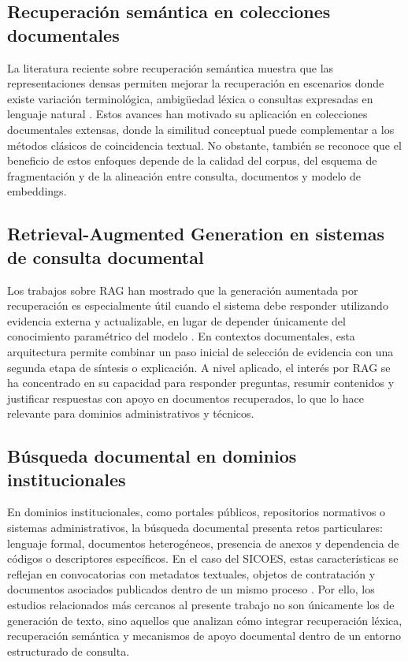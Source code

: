 \subsection{Recuperación semántica en colecciones documentales}

La literatura reciente sobre recuperación semántica muestra que las representaciones densas permiten mejorar la recuperación en escenarios donde existe variación terminológica, ambigüedad léxica o consultas expresadas en lenguaje natural \parencite{reimers2019sentencebert, karpukhin2020dpr}. Estos avances han motivado su aplicación en colecciones documentales extensas, donde la similitud conceptual puede complementar a los métodos clásicos de coincidencia textual. No obstante, también se reconoce que el beneficio de estos enfoques depende de la calidad del corpus, del esquema de fragmentación y de la alineación entre consulta, documentos y modelo de embeddings.

\subsection{Retrieval-Augmented Generation en sistemas de consulta documental}

Los trabajos sobre RAG han mostrado que la generación aumentada por recuperación es especialmente útil cuando el sistema debe responder utilizando evidencia externa y actualizable, en lugar de depender únicamente del conocimiento paramétrico del modelo \parencite{lewis2020rag}. En contextos documentales, esta arquitectura permite combinar un paso inicial de selección de evidencia con una segunda etapa de síntesis o explicación. A nivel aplicado, el interés por RAG se ha concentrado en su capacidad para responder preguntas, resumir contenidos y justificar respuestas con apoyo en documentos recuperados, lo que lo hace relevante para dominios administrativos y técnicos.

\subsection{Búsqueda documental en dominios institucionales}

En dominios institucionales, como portales públicos, repositorios normativos o sistemas administrativos, la búsqueda documental presenta retos particulares: lenguaje formal, documentos heterogéneos, presencia de anexos y dependencia de códigos o descriptores específicos. En el caso del SICOES, estas características se reflejan en convocatorias con metadatos textuales, objetos de contratación y documentos asociados publicados dentro de un mismo proceso \parencite{sicoes}. Por ello, los estudios relacionados más cercanos al presente trabajo no son únicamente los de generación de texto, sino aquellos que analizan cómo integrar recuperación léxica, recuperación semántica y mecanismos de apoyo documental dentro de un entorno estructurado de consulta.
